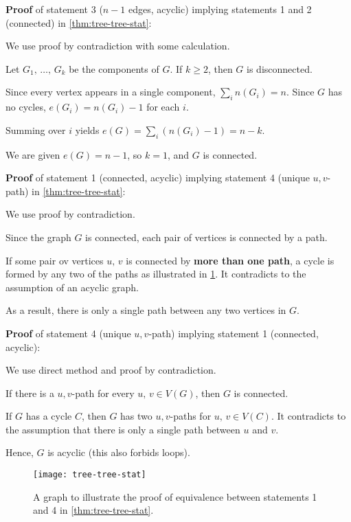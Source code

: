 \documentclass[../src/handouts/main.tex]{subfiles}
\begin{document}
\textbf{Proof} of statement 3 ($n - 1$ edges, acyclic) implying statements 1 and 2 (connected) in \cref{thm:tree-tree-stat}:
\begin{enumerate*}
  \item We use proof by contradiction with some calculation.
  \item Let $G_1,\, \ldots,\, G_k$ be the components of $G$. If $k \geq 2$, then $G$ is disconnected.
  \item Since every vertex appears in a single component, $\sum_i n \left( G_i \right) = n$. Since $G$ has no cycles, $e \left( G_i \right) = n \left( G_i \right) - 1$ for each $i$.
  \item Summing over $i$ yields $e(G) = \sum _i \left( n \left( G_i \right) - 1 \right) = n - k$.
  \item We are given $e(G) = n - 1$, so $k = 1$, and $G$ is connected.
\end{enumerate*}
\vspace{.5em} %

\textbf{Proof} of statement 1 (connected, acyclic) implying statement 4 (unique $u,v$-path) in \cref{thm:tree-tree-stat}:
\begin{enumerate*}
  \item We use proof by contradiction.
  \item Since the graph $G$ is connected, each pair of vertices is connected by a path. 
  \item If some pair ov vertices $u,\, v$ is connected by \textbf{more than one path}, a cycle is formed by any two of the paths as illustrated in \cref{fig:tree-tree-stat}. It contradicts to the assumption of an acyclic graph.
  \item As a result, there is only a single path between any two vertices in $G$.
\end{enumerate*}
\vspace{.5em} %

\clearpage %
\textbf{Proof} of statement 4 (unique $u,v$-path) implying statement 1 (connected, acyclic):
\begin{enumerate*}
  \item We use direct method and proof by contradiction.
  \item If there is a $u,v$-path for every $u,\, v \in V(G)$, then $G$ is connected.
  \item If $G$ has a cycle $C$, then $G$ has two $u,v$-paths for $u,\, v \in V(C)$. It contradicts to the assumption that there is only a single path between $u$ and $v$.
  \item Hence, $G$ is acyclic (this also forbids loops).
\end{enumerate*}
\vspace{.5em} %

\begin{figure}[htbp]
  \centering
  \texttt{[image: tree-tree-stat]}
  \caption{A graph to illustrate the proof of equivalence between statements 1 and 4 in \cref{thm:tree-tree-stat}.}
  \label{fig:tree-tree-stat}
\end{figure}
\end{document}
